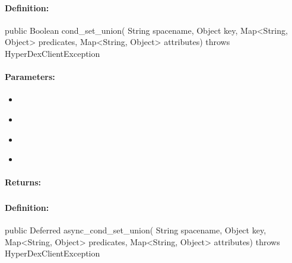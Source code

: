 \paragraph{Definition:}
\begin{javacode}
public Boolean cond_set_union(
        String spacename,
        Object key,
        Map<String, Object> predicates,
        Map<String, Object> attributes) throws HyperDexClientException
\end{javacode}

\paragraph{Parameters:}
\begin{itemize}[noitemsep]
\item {}\\

\item {}\\

\item {}\\

\item {}\\

\end{itemize}

\paragraph{Returns:}


\pagebreak
\subsubsection{}
\label{api:java:async_cond_set_union}


\paragraph{Definition:}
\begin{javacode}
public Deferred async_cond_set_union(
        String spacename,
        Object key,
        Map<String, Object> predicates,
        Map<String, Object> attributes) throws HyperDexClientException
\end{javacode}

